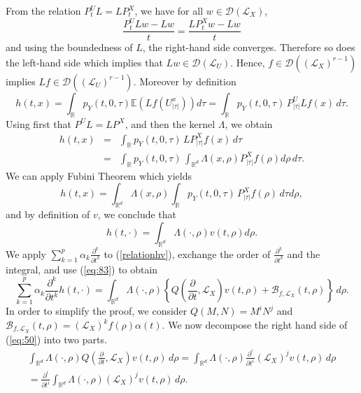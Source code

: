 \documentclass[a4paper, 11pt]{article}
\newcommand{\R}{\mathbb{R}}
\newcommand{\E}{\mathbb{E}}
\newcommand{\1}{\mathbf{1}}
\begin{document}
From the relation $P_t^UL=LP_t^X$, we have for all $w\in\mathcal{D}(\mathcal{L}_X)$,
$$\frac{P_t^ULw-Lw}{t}=\frac{LP_t^Xw-Lw}{t}$$
and using the boundedness of $L$, the right-hand side converges. Therefore so does the left-hand side which implies that $Lw\in\mathcal{D}(\mathcal{L}_U)$. Hence, $f\in\mathcal{D}((\mathcal{L}_X)^{r-1})$ implies $Lf\in\mathcal{D}((\mathcal{L}_U)^{r-1})$. Moreover by definition 
\begin{equation*}
h(t,x)=\int_\R p_Y(t,0,\tau)\E(Lf(U_{|\tau|}^x))d\tau=\int_\R p_Y(t,0,\tau) \, P_{|\tau|}^U  Lf(x) \, d\tau.
\end{equation*}
Using first that $P^U L=LP^X$, and then the kernel $\Lambda$, we obtain 
\begin{eqnarray*}
h(t,x)&=&\int_\R p_Y(t,0,\tau) \, LP_{|\tau|}^X  f(x) \, d\tau\\
&=&\int_\R p_Y(t,0,\tau) \, \int_{\R^d} \Lambda (x, \rho) P_{|\tau|}^X  f(\rho) d\rho \, d\tau.
\end{eqnarray*}
We can apply Fubini Theorem which yields
\begin{equation*}
h(t,x)=\int_{\R^d} \Lambda (x, \rho) \int_\R p_Y(t,0,\tau) \, P_{|\tau|}^X  f(\rho)  \, d\tau d\rho,
\end{equation*}
and by definition of $v$, we conclude that
\begin{equation}\label{relationhv}
h(t,\cdot)=\int_{\R^d} \Lambda (\cdot, \rho) v(t,\rho) d\rho.
\end{equation}
We apply $\sum_{k=1}^{p} \alpha_k \frac{\partial^k}{\partial t^k}$ to (\ref{relationhv}), exchange the order of $\frac{\partial^k}{\partial t^k}$ and the integral, and use (\ref{eq:83}) to obtain
\begin{equation}
\label{eq:50}
\sum_{k=1}^{p} \alpha_k \frac{\partial^k}{\partial t^k} h(t,\cdot)=\int_{\R^d} \Lambda (\cdot, \rho) \left\{Q(\frac{\partial}{\partial t},\mathcal{L}_X)v(t,\rho)+\mathcal{B}_{f,\mathcal{L}_X}(t,\rho)\right\} \, d\rho.
\end{equation}
In order to simplify the proof, we consider $Q(M,N)=M^iN^j$ and $\mathcal{B}_{f,\mathcal{L}_X}(t,\rho)=(\mathcal{L}_X)^kf(\rho)\alpha(t)$. We now decompose the right hand side of (\ref{eq:50}) into two parts.
\begin{multline*}
\int_{\R^d} \Lambda (\cdot, \rho) Q(\frac{\partial}{\partial t},\mathcal{L}_X)v(t,\rho) \, d\rho=\int_{\R^d} \Lambda (\cdot, \rho) \frac{\partial^i}{\partial t^i}(\mathcal{L}_X)^jv(t,\rho) \, d\rho\\
=\frac{\partial^i}{\partial t^i}\int_{\R^d} \Lambda (\cdot, \rho) (\mathcal{L}_X)^jv(t,\rho) \, d\rho.
\end{multline*}
\end{document}
